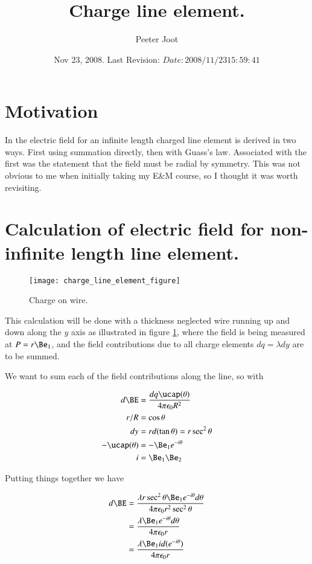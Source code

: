 \documentclass{article}
\title{ Charge line element. }
\author{Peeter Joot}
\date{ Nov 23, 2008.  Last Revision: $Date: 2008/11/23 15:59:41 $ }
\begin{document}
\maketitle{}

\section{Motivation}

In \cite{purcell1963eam} the electric field for an infinite length charged line element is derived in two ways.  First using summation directly, then with Guass's law.  Associated with the first was the statement that the field must be radial by symmetry.  This was not obvious to me when initially taking my E\&M course, so I thought it was worth revisiting.

\section{ Calculation of electric field for non-infinite length line element. }

\begin{figure}[htp]
\centering
\texttt{[image: charge\_line\_element\_figure]}
\caption{Charge on wire.}\label{fig:chargeLineElement}
\end{figure}

This calculation will be done with a thickness neglected wire running up and down along the $y$ axis as illustrated 
in figure \ref{fig:chargeLineElement}, where the field is being measured at $P = r \Be_1$, and the field contributions
due to all charge elements $dq = \lambda dy$ are to be summed.

We want to sum each of the field contributions along the line, so with

\begin{align*}
d\BE &= \frac{dq \ucap(\theta)}{4 \pi \epsilon_0 R^2} \\
r/R &= \cos\theta \\
dy &= r d(\tan\theta) = r \sec^2 \theta \\
-\ucap(\theta) &= -\Be_1 e^{-i \theta} \\
i &= \Be_1 \Be_2 
\end{align*}

Putting things together we have

\begin{align*}
d\BE
&= \frac{\lambda r \sec^2 \theta \Be_1 e^{-i\theta} d\theta}{4 \pi \epsilon_0 r^2 \sec^2 \theta} \\
&= \frac{\lambda \Be_1 e^{-i\theta} d\theta}{4 \pi \epsilon_0 r} \\
&= \frac{\lambda \Be_1 i d(e^{-i\theta})}{4 \pi \epsilon_0 r} \\
\end{align*}
\end{document}
